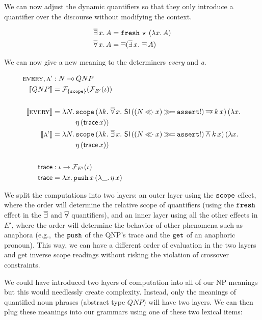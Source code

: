 We can now adjust the dynamic quantifiers so that they only introduce a
quantifier over the discourse without modifying the context.

\begin{align*}
  \mathop{\overline{\exists}} x.\,A &= \mathtt{fresh}\,\star\,(\lambda x.\, A) \\
  \mathop{\overline{\forall}} x.\,A &= \mathop{\overline{\lnot}} (\mathop{\overline{\exists}} x.\,\mathop{\overline{\lnot}} A)
\end{align*}

We can now give a new meaning to the determiners \emph{every} and \emph{a}.

\begin{align*}
  \textsc{every}, \textsc{a'} &: N \mathbin{{-}\mkern-3.5mu{\circ}} QNP \\
  \llbracket QNP \rrbracket &= \mathcal{F}_{\{\mathtt{scope}\}}(\mathcal{F}_{E'}(\iota)) \\
  \\
  \llbracket \textsc{every} \rrbracket &= \lambda N.\, \begin{aligned}[t]
      &\mathtt{scope}\,(\lambda k.\, \mathop{\overline{\forall}} x.\ \mathsf{SI}\,((N \mathbin{\ll\!\!\cdot} x) \mathbin{\gg\!=} \mathtt{assert}!) \mathbin{\overline{\to}} k\,x)\,(\lambda x.\,  \\
      &\eta\,(\mathsf{trace}\,x))
    \end{aligned} \\
  \llbracket \textsc{a'} \rrbracket &= \lambda N.\, \begin{aligned}[t]
      &\mathtt{scope}\,(\lambda k.\, \mathop{\overline{\exists}} x.\ \mathsf{SI}\,((N \mathbin{\ll\!\!\cdot} x) \mathbin{\gg\!=} \mathtt{assert}!) \mathbin{\overline{\land}} k\,x)\,(\lambda x.\,  \\
      &\eta\,(\mathsf{trace}\,x))
    \end{aligned} \\
  \\
  \mathsf{trace} &: \iota \to \mathcal{F}_{E'}(\iota) \\
  \mathsf{trace} &= \lambda x.\, \mathtt{push}\,x\,(\lambda \_.\, \eta\,x)
\end{align*}

We split the computations into two layers: an outer layer using the
$\mathtt{scope}$ effect, where the order will determine the relative scope of
quantifiers (using the $\mathtt{fresh}$ effect in the $\mathop{\overline{\exists}}$ and $\mathop{\overline{\forall}}$
quantifiers), and an inner layer using all the other effects in $E'$, where
the order will determine the behavior of other phenomena such as anaphora
(e.g.,\ the $\mathtt{push}$ of the QNP's trace and the $\mathtt{get}$ of an
anaphoric pronoun). This way, we can have a different order of evaluation
in the two layers and get inverse scope readings without risking the
violation of crossover constraints.

We could have introduced two layers of computation into all of our NP
meanings but this would needlessly create complexity. Instead, only the
meanings of quantified noun phrases (abstract type $QNP$) will have two
layers. We can then plug these meanings into our grammars using one of
these two lexical items:

